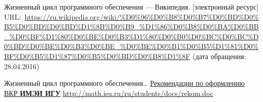 \documentclass[a4paper,14pt,final]{extreport}
\begin{document}
\begin{thebibliography}{99}
 Жизненный цикл программного обеспечения --- Википедия. [электронный ресурс] URL:~\url{https://ru.wikipedia.org/wiki/%D0%96%D0%B8%D0%B7%D0%BD%D0%B5%D0%BD%D0%BD%D1%8B%D0%B9_%D1%86%D0%B8%D0%BA%D0%BB_%D0%BF%D1%80%D0%BE%D0%B3%D1%80%D0%B0%D0%BC%D0%BC%D0%BD%D0%BE%D0%B3%D0%BE_%D0%BE%D0%B1%D0%B5%D1%81%D0%BF%D0%B5%D1%87%D0%B5%D0%BD%D0%B8%D1%8F} (дата обращения: 28.04.2016)

Жизненный цикл программного обеспечения\ldots{}
 \href{http://math.isu.ru/ru/students/docs/rekom.doc}{Рекомендации по оформлению ВКР \textbf{ИМЭИ ИГУ}} \url{http://math.isu.ru/ru/students/docs/rekom.doc}
\end{thebibliography}
\end{document}
